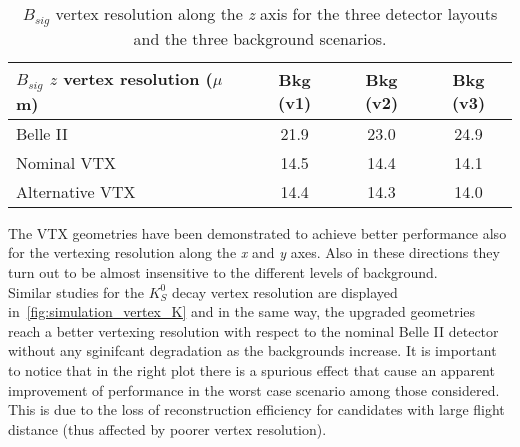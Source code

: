 \begin{table}[htbp]
  \begin{center}
    \begin{tabular}{l|c|c|c}
      \hline\hline
      $B_{sig}$ $z$ vertex resolution ($\mu$m) & Bkg (v1) & Bkg (v2) & Bkg (v3) \\
      \hline\hline
      Belle II & 21.9 & 23.0 & 24.9 \\
      \hline
      Nominal VTX & 14.5 & 14.4 & 14.1 \\
      \hline
      Alternative VTX & 14.4 & 14.3 & 14.0 \\
      \hline\hline
    \end{tabular}
  \end{center}
\caption{$B_{sig}$ vertex resolution along the \textit{z} axis for the three detector layouts and the three background scenarios.}
\label{tab:simulation_vertex_table}
\end{table}

\begin{comment}
\begin{table}[h!]
\centering
\texttt{[image: simulation\_vertex\_table]}
\caption{$B_{sig}$ vertex resolution along the \textit{z} axis for the three detector layouts and the three background scenarios.}
\label{tab:simulation_vertex_table}
\end{table}
\end{comment}

The VTX geometries have been demonstrated to achieve better performance also for the vertexing resolution along the \textit{x} and \textit{y} axes. Also in these directions they turn out to be almost insensitive to the different levels of background.\\

Similar studies for the $K_{S}^{0}$ decay vertex resolution are displayed in~\autoref{fig:simulation_vertex_K} and in the same way, the upgraded geometries reach a better vertexing resolution with respect to the nominal Belle II detector without any sginifcant degradation as the backgrounds increase.
It is important to notice that in the right plot there is a spurious effect that cause an apparent improvement of performance in the worst case scenario among those considered. This is due to the loss of reconstruction efficiency for candidates with large flight distance (thus affected by poorer vertex resolution).

